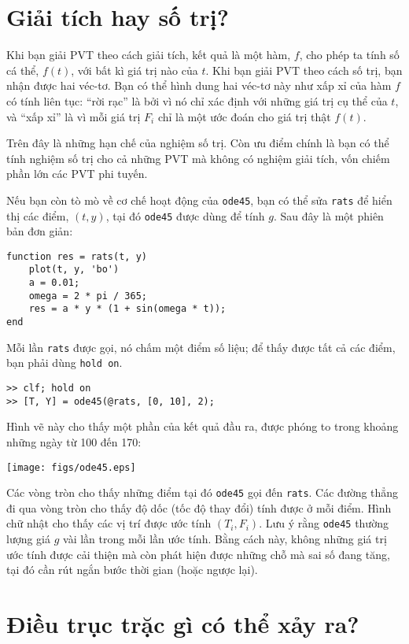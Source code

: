 \documentclass[12pt]{book}
\begin{document}
\section{Giải tích hay số trị?}

Khi bạn giải PVT theo cách giải tích, kết quả là một hàm, $f$,
cho phép ta tính số cá thể, $f(t)$, với bất kì giá trị nào của
$t$.  Khi bạn giải PVT theo cách số trị, bạn nhận được hai véc-tơ.
Bạn có thể hình dung hai véc-tơ này như xấp xỉ của hàm $f$ 
có tính liên tục: ``rời rạc'' là bởi vì nó chỉ xác định với những
giá trị cụ thể của $t$, và ``xấp xỉ'' là vì mỗi giá trị $F_i$
chỉ là một ước đoán cho giá trị thật $f(t)$.

Trên đây là những hạn chế của nghiệm số trị. Còn ưu điểm chính
là bạn có thể tính nghiệm số trị cho cả những PVT mà không có
nghiệm giải tích, vốn chiếm phần lớn các PVT phi tuyến.

Nếu bạn còn tò mò về cơ chế hoạt động của {\tt ode45},
bạn có thể sửa {\tt rats} để hiển thị các điểm, $(t, y)$, 
tại đó {\tt ode45} được dùng để tính $g$. Sau đây là một
phiên bản đơn giản:

\begin{verbatim}
function res = rats(t, y)
    plot(t, y, 'bo')
    a = 0.01;
    omega = 2 * pi / 365;
    res = a * y * (1 + sin(omega * t));
end
\end{verbatim}
%
Mỗi lần {\tt rats} được gọi, nó chấm một điểm số liệu; để thấy 
được tất cả các điểm, bạn phải dùng {\tt hold on}.

\begin{verbatim}
>> clf; hold on
>> [T, Y] = ode45(@rats, [0, 10], 2);
\end{verbatim}
%
Hình vẽ này cho thấy một phần của kết quả đầu ra, được phóng to
trong khoảng những ngày từ 100 đến 170:

\centerline{\texttt{[image: figs/ode45.eps]}}

Các vòng tròn cho thấy những điểm tại đó {\tt ode45} gọi đến 
{\tt rats}. Các đường thẳng đi qua vòng tròn cho thấy độ dốc
(tốc độ thay đổi) tính được ở mỗi điểm. Hình chữ nhật cho thấy
các vị trí được ước tính $(T_i, F_i)$.  Lưu ý rằng {\tt ode45}
thường lượng giá $g$ vài lần trong mỗi lần ước tính. Bằng cách
này, không những giá trị ước tính được cải thiện mà còn phát
hiện được những chỗ mà sai số đang tăng, tại đó cần rút ngắn
bước thời gian (hoặc ngược lại).


\section{Điều trục trặc gì có thể xảy ra?}
\end{document}
